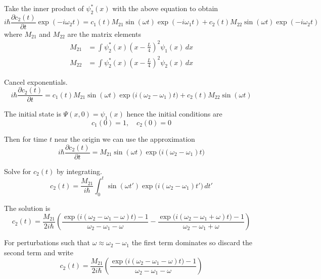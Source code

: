 \documentclass[12pt]{article}
\begin{document}
Take the inner product of $\psi_2^*(x)$ with the above equation to obtain
\begin{equation*}
i\hbar\frac{\partial c_2(t)}{\partial t}\exp(-i\omega_2t)
=c_1(t)M_{21}\sin(\omega t)\exp(-i\omega_1t)+c_2(t)M_{22}\sin(\omega t)\exp(-i\omega_2t)
\end{equation*}
where $M_{21}$ and $M_{22}$ are the matrix elements
\begin{align*}
M_{21}&=\int\psi_2^*(x)\left(x-\frac{L}{4}\right)^2\psi_1(x)\,dx
\\
M_{22}&=\int\psi_2^*(x)\left(x-\frac{L}{4}\right)^2\psi_2(x)\,dx
\end{align*}

Cancel exponentials.
\begin{equation*}
i\hbar\frac{\partial c_2(t)}{\partial t}
=c_1(t)M_{21}\sin(\omega t)\exp\bigl(i(\omega_2-\omega_1)t\bigr)+c_2(t)M_{22}\sin(\omega t)
\end{equation*}

The initial state is $\Psi(x,0)=\psi_1(x)$ hence the initial conditions are
\begin{equation*}
c_1(0)=1,\quad c_2(0)=0
\end{equation*}

Then for time $t$ near the origin we can use the approximation
\begin{equation*}
i\hbar\frac{\partial c_2(t)}{\partial t}
=M_{21}\sin(\omega t)\exp\bigl(i(\omega_2-\omega_1)t\bigr)
\end{equation*}

Solve for $c_2(t)$ by integrating.
\begin{equation*}
c_2(t)=\frac{M_{21}}{i\hbar}\int_0^t\sin(\omega t')\exp\bigl(i(\omega_2-\omega_1)t'\bigr)\,dt'
\end{equation*}

The solution is
\begin{equation*}
c_2(t)
=\frac{M_{21}}{2i\hbar}
\left(
\frac{\exp\bigl(i(\omega_2-\omega_1-\omega) t\bigr)-1}{\omega_2-\omega_1-\omega}
-
\frac{\exp\bigl(i(\omega_2-\omega_1+\omega) t\bigr)-1}{\omega_2-\omega_1+\omega}
\right)\tag{1}
\end{equation*}

For perturbations such that $\omega\approx\omega_2-\omega_1$ the first term
dominates so discard the second term and write
\begin{equation*}
c_2(t)=\frac{M_{21}}{2i\hbar}
\left(
\frac{\exp\bigl(i(\omega_2-\omega_1-\omega) t\bigr)-1}{\omega_2-\omega_1-\omega}
\right)
\end{equation*}
\end{document}
